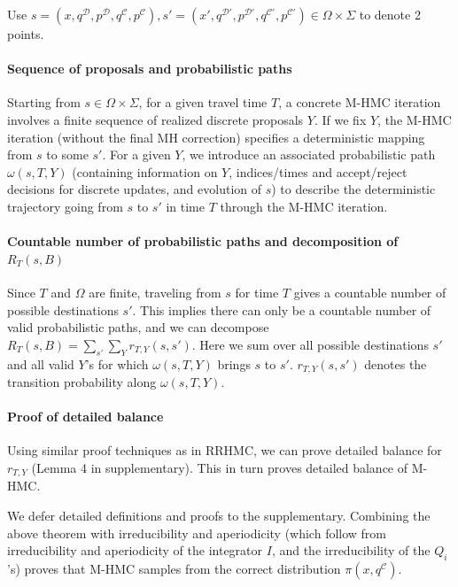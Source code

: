 \documentclass{article}
\newcommand{\cald}{\mathcal{D}}
\newcommand{\calc}{\mathcal{C}}
\newenvironment{proof_sketch}{\textit{Proof Sketch.\hspace*{-1pt}}}{\hfill$\square$}
\begin{document}
\begin{proof_sketch} Use $s=(x, q^\cald, p^\cald, q^\calc, p^\calc), s'=(x', q^{\cald\prime}, p^{\cald\prime}, q^{\calc\prime}, p^{\calc\prime})\in\Omega\times\Sigma$ to denote 2 points.

\vspace*{-7pt}

\paragraph{Sequence of proposals and probabilistic paths} Starting from $s\in\Omega\times\Sigma$, for a given travel time $T$, a concrete M-HMC iteration involves a finite sequence of realized discrete proposals $Y$. If we fix $Y$, the M-HMC iteration (without the final MH correction) specifies a deterministic mapping from $s$ to some $s'$. For a given $Y$, we introduce an associated probabilistic path $\omega(s, T, Y)$ (containing information on $Y$, indices/times and accept/reject decisions for discrete updates, and evolution of $s$) to describe the deterministic trajectory going from $s$ to $s'$ in time $T$ through the M-HMC iteration.

\vspace*{-7pt}

\paragraph{Countable number of probabilistic paths and decomposition of $R_T(s, B)$} Since $T$ and $\Omega$ are finite, traveling from $s$ for time $T$ gives a countable number of possible destinations $s'$. This implies there can only be a countable number of valid probabilistic paths, and we can decompose $R_T(s, B) = \sum_{s'}\sum_{Y} r_{T, Y}(s, s')$. Here we sum over all possible destinations $s'$ and all valid $Y$'s for which $\omega(s, T, Y)$ brings $s$ to $s'$. $r_{T, Y}(s, s')$ denotes the transition probability along $\omega(s, T, Y)$.
\vspace*{-7pt}

\paragraph{Proof of detailed balance} Using similar proof techniques as in RRHMC, we can prove detailed balance for $r_{T, Y}$ (Lemma 4 in supplementary). This in turn proves detailed balance of M-HMC.
\end{proof_sketch}

We defer detailed definitions and proofs to the supplementary. Combining the above theorem with irreducibility and aperiodicity (which follow from irreducibility and aperiodicity of the integrator $I$, and the irreducibility of the $Q_i$'s) proves that M-HMC samples from the correct distribution $\pi (x, q^\calc)$.
\end{document}

